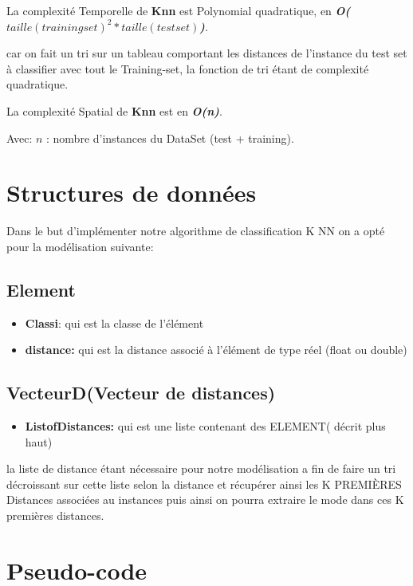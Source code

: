 \documentclass[12pt,a4paper,oneside]{book}
\begin{document}
		La complexité Temporelle de \textbf{Knn} est Polynomial quadratique,  en \textbf{\textit{O($taille(trainingset)^2*taille(testset)$)}}.
		
		car on fait un tri sur un tableau comportant les distances de l'instance du test set à classifier  avec tout le Training-set, la fonction de tri étant de complexité quadratique.
		
		La complexité Spatial  de \textbf{Knn} est en \textbf{\textit{O(n)}}.
		
		
		Avec: $n$ : nombre d'instances du DataSet (test + training).
	
	\section{Structures de données}
	Dans le but d'implémenter notre algorithme de classification  K NN on a opté pour la modélisation suivante:
	
	\subsection{Element}
	
	\begin{itemize}
		\item   \textbf{  Classi}: qui est la classe de l'élément
		\item \textbf{distance:} qui est la distance associé à l'élément de type réel (float ou double)
		
	\end{itemize}
	\subsection{VecteurD(Vecteur de distances)}
	
	\begin{itemize}
		\item\textbf{ ListofDistances:} qui est une liste contenant des ELEMENT( décrit plus haut) 
	\end{itemize}
	la liste de distance étant nécessaire pour notre modélisation a fin de faire un tri décroissant sur cette liste selon la distance  et récupérer ainsi les K PREMIÈRES Distances associées au instances puis ainsi on pourra extraire le mode dans ces K premières distances. 
	\section{Pseudo-code}
	
\end{document}
